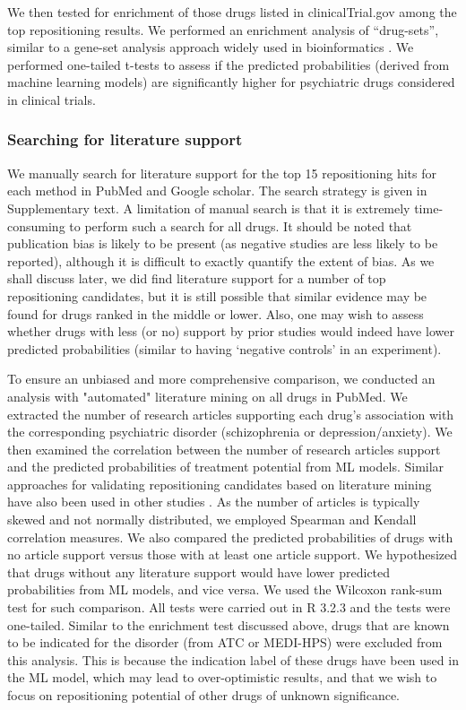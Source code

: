       We then tested for enrichment of those drugs listed in clinicalTrial.gov among the top repositioning results. We performed an enrichment analysis of “drug-sets”, similar to a gene-set analysis approach widely used in bioinformatics \cite{de2016gene}. We performed one-tailed t-tests to assess if the predicted probabilities (derived from machine learning models) are significantly higher for psychiatric drugs considered in clinical trials.

    \subsubsection{Searching for literature support}
      We manually search for literature support for the top 15 repositioning hits for each method in PubMed and Google scholar. The search strategy is given in Supplementary text. A limitation of manual search is that it is extremely time-consuming to perform such a search for all drugs. It should be noted that publication bias is likely to be present (as negative studies are less likely to be reported), although it is difficult to exactly quantify the extent of bias. As we shall discuss later, we did find literature support for a number of top repositioning candidates, but it is still possible that similar evidence may be found for drugs ranked in the middle or lower. Also, one may wish to assess whether drugs with less (or no) support by prior studies would indeed have lower predicted probabilities (similar to having ‘negative controls’ in an experiment). 

      To ensure an unbiased and more comprehensive comparison, we conducted an analysis with "automated" literature mining on all drugs in PubMed. We extracted the number of research articles supporting each drug’s association with the corresponding psychiatric disorder (schizophrenia or depression/anxiety). We then examined the correlation between the number of research articles support and the predicted probabilities of treatment potential from ML models. Similar approaches for validating repositioning candidates based on literature mining have also been used in other studies \cite{huang2014drugcomboranker}. As the number of articles is typically skewed and not normally distributed, we employed Spearman and Kendall correlation measures. We also compared the predicted probabilities of drugs with no article support versus those with at least one article support. We hypothesized that drugs without any literature support would have lower predicted probabilities from ML models, and vice versa. We used the Wilcoxon rank-sum test for such comparison. All tests were carried out in R 3.2.3 and the tests were one-tailed. Similar to the enrichment test discussed above, drugs that are known to be indicated for the disorder (from ATC or MEDI-HPS) were excluded from this analysis. This is because the indication label of these drugs have been used in the ML model, which may lead to over-optimistic results, and that we wish to focus on repositioning potential of other drugs of unknown significance.


